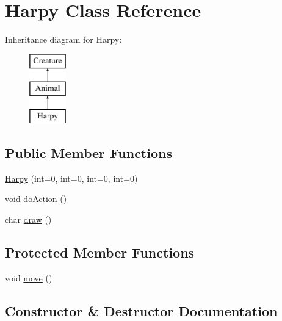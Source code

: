 \hypertarget{class_harpy}{}\section{Harpy Class Reference}
\label{class_harpy}
Inheritance diagram for Harpy\+:\begin{figure}[H]
\begin{center}
\leavevmode
\includegraphics[height=3.000000cm]{class_harpy}
\end{center}
\end{figure}
\subsection*{Public Member Functions}
\begin{DoxyCompactItemize}
\item 
\hyperlink{class_harpy_abf2c43ecb0e635d9b3027e9f1b246067}{Harpy} (int=0, int=0, int=0, int=0)
\item 
void \hyperlink{class_harpy_ab296058454b33ba304b2f6533bcd1994}{do\+Action} ()
\item 
char \hyperlink{class_harpy_aff50872bc2e137a69e4eacc45a739d95}{draw} ()
\end{DoxyCompactItemize}
\subsection*{Protected Member Functions}
\begin{DoxyCompactItemize}
\item 
void \hyperlink{class_harpy_a0a4f8328e78902b76fba8eecf5e0c99e}{move} ()
\end{DoxyCompactItemize}


\subsection{Constructor \& Destructor Documentation}
